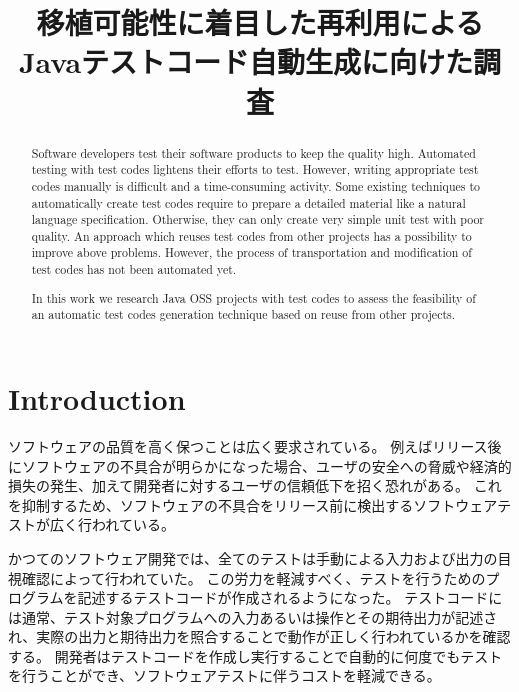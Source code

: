 \documentclass[conference]{IEEEtran}
\begin{document}
\title{移植可能性に着目した再利用によるJavaテストコード自動生成に向けた調査}

\author{
}

\maketitle

\begin{abstract}
Software developers test their software products to keep the quality high.
Automated testing with test codes lightens their efforts to test.
However, writing appropriate test codes manually is difficult and a time-consuming activity.
Some existing techniques to automatically create test codes require to prepare a detailed material like a natural language specification.
Otherwise, they can only create very simple unit test with poor quality.
An approach which reuses test codes from other projects has a possibility to improve above problems. 
However, the process of transportation and modification of test codes has not been automated yet.

In this work we research Java OSS projects with test codes to assess the feasibility of an automatic test codes generation technique based on reuse from other projects.


\end{abstract}

\IEEEpeerreviewmaketitle



\section{Introduction}
ソフトウェアの品質を高く保つことは広く要求されている。
例えばリリース後にソフトウェアの不具合が明らかになった場合、ユーザの安全への脅威や経済的損失の発生、加えて開発者に対するユーザの信頼低下を招く恐れがある。
これを抑制するため、ソフトウェアの不具合をリリース前に検出するソフトウェアテストが広く行われている。

かつてのソフトウェア開発では、全てのテストは手動による入力および出力の目視確認によって行われていた。
この労力を軽減すべく、テストを行うためのプログラムを記述するテストコードが作成されるようになった\cite{Klammer2017}。
テストコードには通常、テスト対象プログラムへの入力あるいは操作とその期待出力が記述され、実際の出力と期待出力を照合することで動作が正しく行われているかを確認する。
開発者はテストコードを作成し実行することで自動的に何度でもテストを行うことができ、ソフトウェアテストに伴うコストを軽減できる\cite{Orso2014}。
\end{document}
